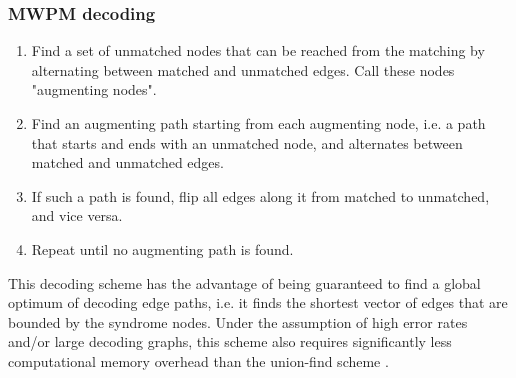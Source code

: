 \subsubsection{MWPM decoding}
\begin{enumerate}
    \item Find a set of unmatched nodes that can be reached from the 
    matching by alternating between matched and unmatched edges. 
    Call these nodes "augmenting nodes".
    \item Find an augmenting path starting from each augmenting node,
    i.e. a path that starts and ends with an unmatched node, and
    alternates between matched and unmatched edges. 
    \item If such a path is found, flip all edges along it from matched
    to unmatched, and vice versa.
    \item Repeat until no augmenting path is found.
\end{enumerate}
This decoding scheme has the advantage of being guaranteed
to find a global optimum of decoding edge paths, i.e. it finds the shortest vector
of edges that are bounded by the syndrome nodes.
Under the assumption of high error rates and/or large decoding 
graphs, this scheme also requires significantly less
computational memory overhead than the union-find scheme
\cite{MWPMDecoder}.